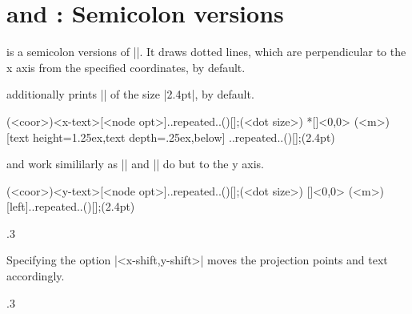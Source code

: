 \section{\protect\cmd{\tzprojsx(*)} and \protect\cmd{\tzprojsy(*)}: Semicolon versions}
\label{s:tzprojsx}

\icmd{\tzprojsx} is a semicolon versions of |\tzprojx|. It draws dotted lines, which are perpendicular to the x axis from the specified coordinates, by default.

\icmd{\tzprojsx*} additionally prints |\tzdots*| of the size |2.4pt|, by default.


\begin{tzdef}{}
            (<coor>){<x-text>}[<node opt>]..repeated..(){}[];(<dot size>)
 *[]<0,0> (<m>){}[text height=1.25ex,text depth=.25ex,below]
          ..repeated..(){}[];(2.4pt)
\end{tzdef}


\icmd{\tzprojsy} and \icmd{\tzprojsy*} work simililarly as |\tzprojsx| and |\tzprojsx*| do but to the y axis.

\begin{tzdef}{}
          (<coor>){<y-text>}[<node opt>]..repeated..(){}[];(<dot size>)
  []<0,0> (<m>){}[left]..repeated..(){}[];(2.4pt)
\end{tzdef}


\begin{tzcode}{.3}
\end{tzcode}

Specifying the option |<x-shift,y-shift>| moves the projection points and text accordingly.

\begin{tzcode}{.3}
\end{tzcode}



